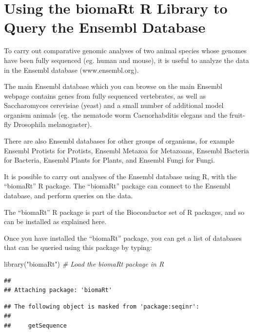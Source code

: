 \documentclass[
]{book}
\newenvironment{Shaded}{\begin{snugshade}}{\end{snugshade}}
\newcommand{\CommentTok}[1]{\textcolor[rgb]{0.56,0.35,0.01}{\textit{#1}}}
\newcommand{\FunctionTok}[1]{\textcolor[rgb]{0.00,0.00,0.00}{#1}}
\newcommand{\NormalTok}[1]{#1}
\newcommand{\StringTok}[1]{\textcolor[rgb]{0.31,0.60,0.02}{#1}}
\begin{document}
\hypertarget{using-the-biomart-r-library-to-query-the-ensembl-database}{%
\chapter{Using the biomaRt R Library to Query the Ensembl Database}\label{using-the-biomart-r-library-to-query-the-ensembl-database}}

To carry out comparative genomic analyses of two animal species whose genomes have been fully sequenced (eg. human and mouse), it is useful to analyze the data in the Ensembl database (www.ensembl.org).

The main Ensembl database which you can browse on the main Ensembl webpage contains genes from fully sequenced vertebrates, as well as Saccharomyces cerevisiae (yeast) and a small number of additional model organism animals (eg. the nematode worm Caenorhabditis elegans and the fruit-fly Drosophila melanogaster).

There are also Ensembl databases for other groups of organisms, for example Ensembl Protists for Protists, Ensembl Metazoa for Metazoans, Ensembl Bacteria for Bacteria, Ensembl Plants for Plants, and Ensembl Fungi for Fungi.

It is possible to carry out analyses of the Ensembl database using R, with the ``biomaRt'' R package. The ``biomaRt'' package can connect to the Ensembl database, and perform queries on the data.

The ``biomaRt'' R package is part of the Bioconductor set of R packages, and so can be installed as explained here.

Once you have installed the ``biomaRt'' package, you can get a list of databases that can be queried using this package by typing:

\begin{Shaded}
\begin{Highlighting}[]
\FunctionTok{library}\NormalTok{(}\StringTok{"biomaRt"}\NormalTok{) }\CommentTok{\# Load the biomaRt package in R}
\end{Highlighting}
\end{Shaded}

\begin{verbatim}
## 
## Attaching package: 'biomaRt'
\end{verbatim}

\begin{verbatim}
## The following object is masked from 'package:seqinr':
## 
##     getSequence
\end{verbatim}
\end{document}
